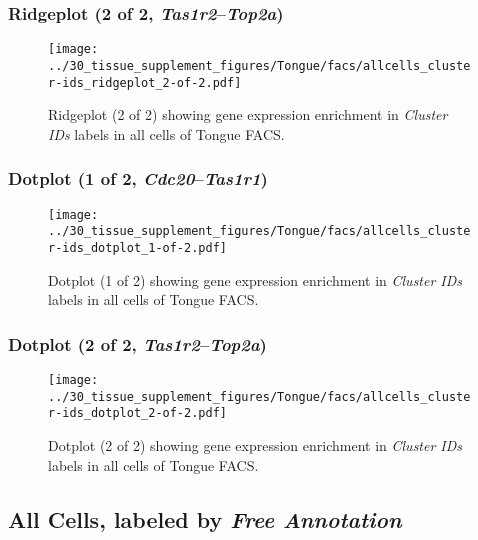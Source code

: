 \clearpage

\subsubsection{Ridgeplot (2 of 2, \emph{Tas1r2}--\emph{Top2a})}
\begin{figure}[h]
\centering
\texttt{[image: ../30\_tissue\_supplement\_figures/Tongue/facs/allcells\_cluster-ids\_ridgeplot\_2-of-2.pdf]}

\caption{ Ridgeplot (2 of 2)  showing gene expression enrichment in \emph{Cluster IDs} labels in all cells of Tongue FACS. }
\end{figure}


\clearpage

\subsubsection{Dotplot (1 of 2, \emph{Cdc20}--\emph{Tas1r1})}
\begin{figure}[h]
\centering
\texttt{[image: ../30\_tissue\_supplement\_figures/Tongue/facs/allcells\_cluster-ids\_dotplot\_1-of-2.pdf]}

\caption{ Dotplot (1 of 2)  showing gene expression enrichment in \emph{Cluster IDs} labels in all cells of Tongue FACS. }
\end{figure}


\clearpage

\subsubsection{Dotplot (2 of 2, \emph{Tas1r2}--\emph{Top2a})}
\begin{figure}[h]
\centering
\texttt{[image: ../30\_tissue\_supplement\_figures/Tongue/facs/allcells\_cluster-ids\_dotplot\_2-of-2.pdf]}

\caption{ Dotplot (2 of 2)  showing gene expression enrichment in \emph{Cluster IDs} labels in all cells of Tongue FACS. }
\end{figure}


\clearpage

\subsection{All Cells, labeled by \emph{Free Annotation}}

